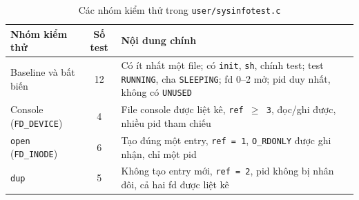 \begin{table}[H]
    \centering
    \renewcommand{\arraystretch}{1.3}
    \setlength{\tabcolsep}{8pt}
    \begin{tabular}{|l|c|p{8cm}|}
        \hline
        \rowcolor[rgb]{0.8, 0.9, 1.0}
        \textbf{Nhóm kiểm thử} & \textbf{Số test} & \textbf{Nội dung chính} \\ \hline
        Baseline và bất biến & 12 & Có ít nhất một file; có \texttt{init}, \texttt{sh}, chính test; test \texttt{RUNNING}, cha \texttt{SLEEPING}; fd 0–2 mở; pid duy nhất, không có \texttt{UNUSED} \\ \hline
        Console (\texttt{FD\_DEVICE}) & 4 & File console được liệt kê, \texttt{ref $\ge$ 3}, đọc/ghi được, nhiều pid tham chiếu \\ \hline
        \texttt{open} (\texttt{FD\_INODE}) & 6 & Tạo đúng một entry, \texttt{ref = 1}, \texttt{O\_RDONLY} được ghi nhận, chỉ một pid \\ \hline
        \texttt{dup} & 5 & Không tạo entry mới, \texttt{ref = 2}, pid không bị nhân đôi, cả hai fd được liệt kê \\ \hline
    \end{tabular}
    \caption{Các nhóm kiểm thử trong \texttt{user/sysinfotest.c}}
\end{table}

